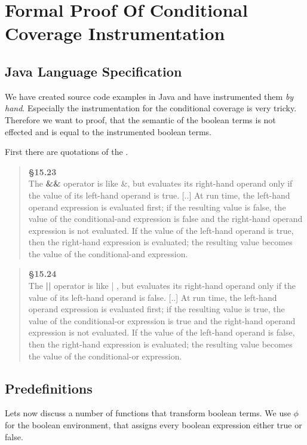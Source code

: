 \section{Formal Proof Of Conditional Coverage Instrumentation} \label{Formal Proof}
\subsection{Java Language Specification}
\par We have created source code examples in Java and have instrumented them \textit{by hand}. Especially the instrumentation for the conditional coverage is very tricky. Therefore we want to proof, that the semantic of the boolean terms is not effected and is equal to the instrumented boolean terms.
\par First there are quotations of the .

\begin{quote}
\textbf{§15.23}\\
The \textbf{\&\&} operator is like \&, but evaluates its right-hand operand only if the value of its left-hand operand is true. [..] At run time, the left-hand operand expression is evaluated first; if the resulting value is false, the value of the conditional-and expression is false and the right-hand operand expression is not evaluated. If the value of the left-hand operand is true, then the right-hand expression is evaluated; the resulting value becomes the value of the conditional-and expression.
\end{quote}

\begin{quote}
\textbf{§15.24}\\
The \textbf{||} operator is like | , but evaluates its right-hand operand only if the value of its left-hand operand is false. [..] At run time, the left-hand operand expression is evaluated first; if the resulting value is true, the value of the conditional-or expression is true and the right-hand operand expression is not evaluated. If the value of the left-hand operand is false, then the right-hand expression is evaluated; the resulting value becomes the value of the conditional-or expression.
\end{quote}

\subsection{Predefinitions}
Lets now discuss a number of functions that transform boolean terms. We use $\phi$ for the boolean environment, that assigns every boolean expression either true or false.

